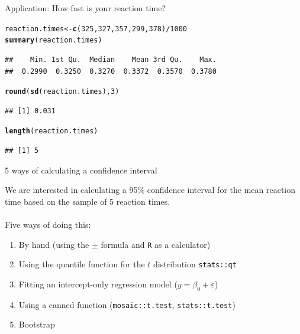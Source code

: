 \documentclass[10pt]{beamer}\usepackage[]{graphicx}\usepackage[]{color}
\makeatletter
\newcommand{\hlnum}[1]{\textcolor[rgb]{0.686,0.059,0.569}{#1}}%
\newcommand{\hlopt}[1]{\textcolor[rgb]{0,0,0}{#1}}%
\newcommand{\hlstd}[1]{\textcolor[rgb]{0.345,0.345,0.345}{#1}}%
\newcommand{\hlkwb}[1]{\textcolor[rgb]{0.69,0.353,0.396}{#1}}%
\newcommand{\hlkwd}[1]{\textcolor[rgb]{0.737,0.353,0.396}{\textbf{#1}}}%
\newenvironment{kframe}{%
 \def\at@end@of@kframe{}%
 \ifinner\ifhmode%
  \def\at@end@of@kframe{\end{minipage}}%
  \begin{minipage}{\columnwidth}%
 \fi\fi%
 \def\FrameCommand##1{\hskip\@totalleftmargin \hskip-\fboxsep
 \colorbox{shadecolor}{##1}\hskip-\fboxsep
     \hskip-\linewidth \hskip-\@totalleftmargin \hskip\columnwidth}%
 \MakeFramed {\advance\hsize-\width
   \@totalleftmargin\z@ \linewidth\hsize
   \@setminipage}}%
 {\par\unskip\endMakeFramed%
 \at@end@of@kframe}
\newenvironment{knitrout}{}{} %
\makeatother
\begin{document}
\begin{frame}[fragile]{Application: How fast is your reaction time?}
\begin{knitrout}\tiny
{}\color{fgcolor}\begin{kframe}
\begin{alltt}
\hlstd{reaction.times} \hlkwb{<-} \hlkwd{c}\hlstd{(}\hlnum{325}\hlstd{,}\hlnum{327}\hlstd{,}\hlnum{357}\hlstd{,}\hlnum{299}\hlstd{,}\hlnum{378}\hlstd{)}\hlopt{/}\hlnum{1000}
\hlkwd{summary}\hlstd{(reaction.times)}
\end{alltt}
\begin{verbatim}
##    Min. 1st Qu.  Median    Mean 3rd Qu.    Max. 
##  0.2990  0.3250  0.3270  0.3372  0.3570  0.3780
\end{verbatim}
\begin{alltt}
\hlkwd{round}\hlstd{(}\hlkwd{sd}\hlstd{(reaction.times),}\hlnum{3}\hlstd{)}
\end{alltt}
\begin{verbatim}
## [1] 0.031
\end{verbatim}
\begin{alltt}
\hlkwd{length}\hlstd{(reaction.times)}
\end{alltt}
\begin{verbatim}
## [1] 5
\end{verbatim}
\end{kframe}
\end{knitrout}
	
\end{frame}


\begin{frame}[fragile]{5 ways of calculating a confidence interval}
	
	We are interested in calculating a 95\% confidence interval for the mean reaction time based on the sample of 5 reaction times. \\ \ \\
	\pause
	Five ways of doing this:
	\begin{enumerate}
		\setlength\itemsep{1em}
		\item By hand (using the $\pm$ formula and \texttt{R} as a calculator)
		\item Using the quantile function for the $t$ distribution \texttt{stats::qt}
		\item Fitting an intercept-only regression model ($y = \beta_0 + \varepsilon$)
		\item Using a canned function (\texttt{mosaic::t.test}, \texttt{stats::t.test})
		\item Bootstrap
	\end{enumerate}
	
\end{frame}
\end{document}
